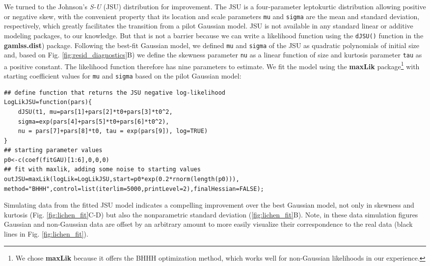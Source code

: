 \documentclass[12pt]{article}
\begin{document}
\begin{spacing}{1.9}
We turned to the Johnson's \emph{S-U} (JSU) distribution for improvement. 
The JSU is a four-parameter leptokurtic distribution allowing positive or negative skew, with the convenient property that its location and scale parameters \texttt{mu} and \texttt{sigma} are the mean and standard deviation, respectively, which greatly facilitates the transition from a pilot Gaussian model. 
JSU is not available in any standard linear or additive modeling packages, to our knowledge. 
But that is not a barrier because we can write a likelihood function using the \texttt{dJSU()} function in the \textbf{gamlss.dist}) package. 
Following the best-fit Gaussian model, we defined \texttt{mu} and \texttt{sigma} of the JSU as quadratic polynomials of initial size and, based on Fig. \ref{fig:resid_diagnostics}B) we define the skewness parameter \texttt{nu} as a linear function of size and kurtosis parameter \texttt{tau} as a positive constant. The likelihood function therefore has nine parameters to estimate.
We fit the model using the \textbf{maxLik} package\footnote{We chose \textbf{maxLik} because it offers the BHHH optimization method, which works well for non-Gaussian likelihoods in our experience.} with starting coefficient values for \texttt{mu} and \texttt{sigma} based on the pilot Gaussian model:
\begin{lstlisting}
## define function that returns the JSU negative log-likelihood
LogLikJSU=function(pars){
	dJSU(t1, mu=pars[1]+pars[2]*t0+pars[3]*t0^2,
	sigma=exp(pars[4]+pars[5]*t0+pars[6]*t0^2),
	nu = pars[7]+pars[8]*t0, tau = exp(pars[9]), log=TRUE)
}
## starting parameter values
p0<-c(coef(fitGAU)[1:6],0,0,0)
## fit with maxlik, adding some noise to starting values
outJSU=maxLik(logLik=LogLikJSU,start=p0*exp(0.2*rnorm(length(p0))),
method="BHHH",control=list(iterlim=5000,printLevel=2),finalHessian=FALSE); 
\end{lstlisting}

Simulating data from the fitted JSU model indicates a compelling improvement over the best Gaussian model, not only in skewness and kurtosis (Fig. \ref{fig:lichen_fit}C-D) but also the nonparametric standard deviation (\ref{fig:lichen_fit}B). 
Note, in these data simulation figures Gaussian and non-Gaussian data are offset by an arbitrary amount to more easily visualize their correspondence to the real data (black lines in Fig. \ref{fig:lichen_fit}). 


\end{spacing}
\end{document}
